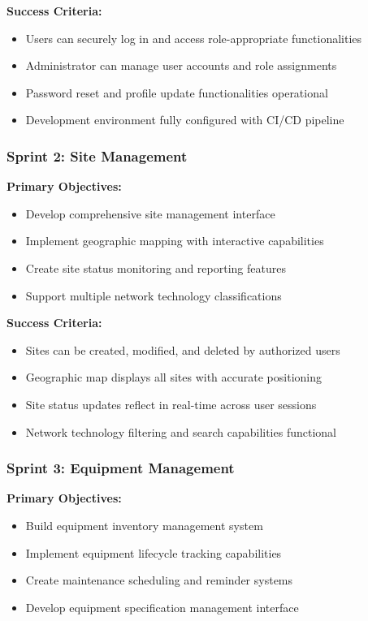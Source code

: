 \textbf{Success Criteria:}
\begin{itemize}
\item Users can securely log in and access role-appropriate functionalities
\item Administrator can manage user accounts and role assignments
\item Password reset and profile update functionalities operational
\item Development environment fully configured with CI/CD pipeline
\end{itemize}

\subsubsection{Sprint 2: Site Management}
\textbf{Primary Objectives:}
\begin{itemize}
\item Develop comprehensive site management interface
\item Implement geographic mapping with interactive capabilities
\item Create site status monitoring and reporting features
\item Support multiple network technology classifications
\end{itemize}

\textbf{Success Criteria:}
\begin{itemize}
\item Sites can be created, modified, and deleted by authorized users
\item Geographic map displays all sites with accurate positioning
\item Site status updates reflect in real-time across user sessions
\item Network technology filtering and search capabilities functional
\end{itemize}

\subsubsection{Sprint 3: Equipment Management}
\textbf{Primary Objectives:}
\begin{itemize}
\item Build equipment inventory management system
\item Implement equipment lifecycle tracking capabilities
\item Create maintenance scheduling and reminder systems
\item Develop equipment specification management interface
\end{itemize}

